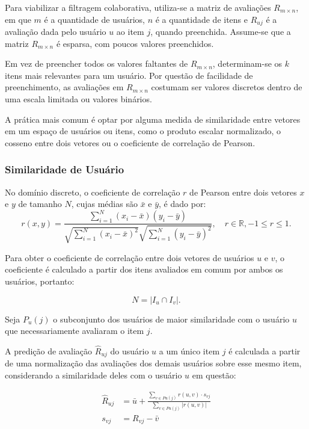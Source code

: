 Para viabilizar a filtragem colaborativa, utiliza-se a matriz de avaliações
$R_{m \times n}$, em que $m$ é a quantidade de usuários, $n$ é a quantidade de
itens e $R_{uj}$ é a avaliação dada pelo usuário $u$ ao item $j$, quando
preenchida. Assume-se que a matriz $R_{m \times n}$ é esparsa, com poucos
valores preenchidos.

Em vez de preencher todos os valores faltantes de $R_{m \times n}$,
determinam-se os $k$ itens mais relevantes para um usuário. Por questão de
facilidade de preenchimento, as avaliações em $R_{m \times n}$ costumam ser
valores discretos dentro de uma escala limitada ou valores binários.

A prática mais comum é optar por alguma medida de similaridade entre vetores em
um espaço de usuários ou itens, como o produto escalar normalizado, o cosseno
entre dois vetores ou o coeficiente de correlação de Pearson.

\subsubsection{Similaridade de Usuário}
No domínio discreto, o coeficiente de correlação $r$ de Pearson entre dois vetores $x$ e $y$ de
tamanho $N$, cujas médias são $\bar{x}$ e $\bar{y}$, é dado por:
\begin{equation}    
    r(x,y) = \frac{\sum_{i=1}^{N}(x_i - \bar{x})(y_i - \bar{y})}{\sqrt{\sum_{i=1}^{N}(x_i - \bar{x})^2} \sqrt{\sum_{i=1}^{N}(y_i - \bar{y})^2}}, \quad r \in \mathbb{R}, -1 \leq r \leq 1.
\end{equation}

Para obter o coeficiente de correlação entre dois vetores de usuários $u$ e $v$,
o coeficiente é calculado a partir dos itens avaliados em comum por ambos os
usuários, portanto:

\begin{equation}
    N = |I_u \cap I_v|.
\end{equation}

Seja $P_u (j)$ o subconjunto dos usuários de maior similaridade com o usuário
$u$ que necessariamente avaliaram o item $j$.

A predição de avaliação
$\hat{R}_{uj}$ do usuário $u$ a um único item $j$ é calculada a partir de uma
normalização das avaliações dos demais usuários sobre esse mesmo item,
considerando a similaridade deles com o usuário $u$ em questão:

\begin{align}
    \label{eq:predicao}
\hat{R}_{uj} &= \bar{u} + \frac{\sum_{v \in Pu(j)} r(u,v) \cdot s_{vj}}{\sum_{v \in Pu(j)} |r(u,v)|} \\
s_{vj} &= R_{vj} - \bar{v}
\end{align}

